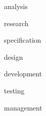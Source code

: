 \documentclass[12pt]{report}
\begin{document}




\newpage
\tableofcontents

\newpage
\listoffigures

\newpage
\listoftables

{analysis}

{research}

{specification}

{design}

{development}

{testing}

{management}





\end{document}
